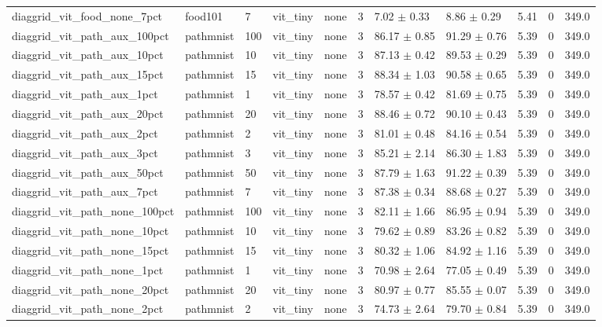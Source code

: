 \begin{tabular}{lllllllllll}
diaggrid_vit_food_none_7pct & food101 & 7 & vit_tiny & none & 3 & 7.02 $\pm$ 0.33 & 8.86 $\pm$ 0.29 & 5.41 & 0 & 349.0 \\
diaggrid_vit_path_aux_100pct & pathmnist & 100 & vit_tiny & none & 3 & 86.17 $\pm$ 0.85 & 91.29 $\pm$ 0.76 & 5.39 & 0 & 349.0 \\
diaggrid_vit_path_aux_10pct & pathmnist & 10 & vit_tiny & none & 3 & 87.13 $\pm$ 0.42 & 89.53 $\pm$ 0.29 & 5.39 & 0 & 349.0 \\
diaggrid_vit_path_aux_15pct & pathmnist & 15 & vit_tiny & none & 3 & 88.34 $\pm$ 1.03 & 90.58 $\pm$ 0.65 & 5.39 & 0 & 349.0 \\
diaggrid_vit_path_aux_1pct & pathmnist & 1 & vit_tiny & none & 3 & 78.57 $\pm$ 0.42 & 81.69 $\pm$ 0.75 & 5.39 & 0 & 349.0 \\
diaggrid_vit_path_aux_20pct & pathmnist & 20 & vit_tiny & none & 3 & 88.46 $\pm$ 0.72 & 90.10 $\pm$ 0.43 & 5.39 & 0 & 349.0 \\
diaggrid_vit_path_aux_2pct & pathmnist & 2 & vit_tiny & none & 3 & 81.01 $\pm$ 0.48 & 84.16 $\pm$ 0.54 & 5.39 & 0 & 349.0 \\
diaggrid_vit_path_aux_3pct & pathmnist & 3 & vit_tiny & none & 3 & 85.21 $\pm$ 2.14 & 86.30 $\pm$ 1.83 & 5.39 & 0 & 349.0 \\
diaggrid_vit_path_aux_50pct & pathmnist & 50 & vit_tiny & none & 3 & 87.79 $\pm$ 1.63 & 91.22 $\pm$ 0.39 & 5.39 & 0 & 349.0 \\
diaggrid_vit_path_aux_7pct & pathmnist & 7 & vit_tiny & none & 3 & 87.38 $\pm$ 0.34 & 88.68 $\pm$ 0.27 & 5.39 & 0 & 349.0 \\
diaggrid_vit_path_none_100pct & pathmnist & 100 & vit_tiny & none & 3 & 82.11 $\pm$ 1.66 & 86.95 $\pm$ 0.94 & 5.39 & 0 & 349.0 \\
diaggrid_vit_path_none_10pct & pathmnist & 10 & vit_tiny & none & 3 & 79.62 $\pm$ 0.89 & 83.26 $\pm$ 0.82 & 5.39 & 0 & 349.0 \\
diaggrid_vit_path_none_15pct & pathmnist & 15 & vit_tiny & none & 3 & 80.32 $\pm$ 1.06 & 84.92 $\pm$ 1.16 & 5.39 & 0 & 349.0 \\
diaggrid_vit_path_none_1pct & pathmnist & 1 & vit_tiny & none & 3 & 70.98 $\pm$ 2.64 & 77.05 $\pm$ 0.49 & 5.39 & 0 & 349.0 \\
diaggrid_vit_path_none_20pct & pathmnist & 20 & vit_tiny & none & 3 & 80.97 $\pm$ 0.77 & 85.55 $\pm$ 0.07 & 5.39 & 0 & 349.0 \\
diaggrid_vit_path_none_2pct & pathmnist & 2 & vit_tiny & none & 3 & 74.73 $\pm$ 2.64 & 79.70 $\pm$ 0.84 & 5.39 & 0 & 349.0 \\

\end{tabular}
